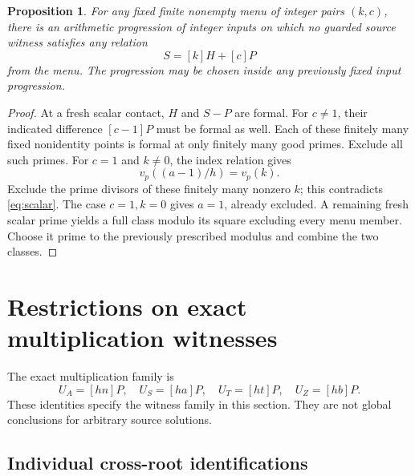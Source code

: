 \documentclass[11pt,a4paper]{article}
\newtheorem{proposition}[theorem]{Proposition}
\begin{document}
\begin{proposition}\label{prop:reference}
For any fixed finite nonempty menu of integer pairs $(k,c)$,
there is an arithmetic progression of integer inputs on which
no guarded source witness satisfies any relation
\[
                             S=[k]H+[c]P
\]
from the menu. The progression may be chosen inside any
previously fixed input progression.
\end{proposition}
\begin{proof}
At a fresh scalar contact, $H$ and $S-P$ are formal.
For $c\ne1$, their indicated difference $[c-1]P$ must be
formal as well. Each of these finitely many fixed nonidentity
points is formal at only finitely many good primes. Exclude all
such primes. For $c=1$ and $k\ne0$, the index relation gives
\[
                     v_p((a-1)/h)=v_p(k).
\]
Exclude the prime divisors of these finitely many nonzero $k$;
this contradicts \eqref{eq:scalar}. The case $c=1,k=0$ gives
$a=1$, already excluded. A remaining fresh scalar prime yields
a full class modulo its square excluding every menu member.
Choose it prime to the previously prescribed modulus and combine
the two classes.
\end{proof}

\section{Restrictions on exact multiplication witnesses}

The exact multiplication family is
\begin{equation}\label{eq:prepared}
 U_A=[hn]P,\quad U_S=[ha]P,\quad
 U_T=[ht]P,\quad U_Z=[hb]P.
\end{equation}
These identities specify the witness family in this section.
They are not global conclusions for arbitrary source solutions.

\subsection{Individual cross-root identifications}
\end{document}
